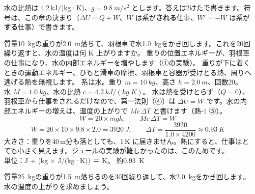 
\noindent 水の比熱は 4.2\,kJ/(kg·K)、$g=\qty{9.8}{m/s^2}$ とします。答えは2けたで書きます。符号は、この章の決まり（$\Delta U=Q+W$、$W$ は系が\textbf{される}仕事、$W'=-W$ は系が\textbf{する}仕事）で書きます。

\label{ph:熱-2:ex1}
\begin{phreidai}
質量\qty{10}{kg}の重りが\qty{2.0}{m}落ちて、羽根車で水\qty{1.0}{kg}をかき回します。これを20回繰り返すと、水の温度は何 K 上がりますか。
\phbamen
重りの位置エネルギーが、羽根車の仕事になり、水の内部エネルギーを増やします（①の実験）。
\phmushi
重りが下に着くときの運動エネルギー、ひもと滑車の摩擦、羽根車と容器が受けとる熱、周りへ逃げる熱を無視します。
\phzu
系は水。重り $m=\qty{10}{kg}$、高さ $h=\qty{2.0}{m}$、回数20。\\
水 $M=\qty{1.0}{kg}$、水の比熱 $c=\qty{4.2}{kJ/(kg.K)}$。
\phriyu
水は熱を受けとらず（$Q=0$）、羽根車から仕事をされるだけなので、第一法則（④）は $\Delta U=W$ です。水の内部エネルギーの増えは、温度の上がりで $Mc\,\Delta T$ と書けます（熱-1 ③）。
\phtateru
\[W=20\times mgh,\qquad Mc\,\Delta T=W\]
\phtoku
\[W=20\times10\times9.8\times2.0=\qty{3920}{J},\qquad \Delta T=\frac{3920}{1.0\times4200}\approx\qty{0.93}{K}\]
\phtashikame
大きさ：重りを40\,m分も落としても、1\,K に届きません。熱にすると、仕事はとても小さく見えます。ジュールの実験が難しかったのは、このためです。\\
単位：J ÷ (kg × J/(kg·K)) ＝ K。
\kotae 約\qty{0.93}{K}
\end{phreidai}
\begin{jibun}
質量\qty{25}{kg}の重りが\qty{1.5}{m}落ちるのを30回繰り返して、水\qty{2.0}{kg}をかき回します。水の温度の上がりを求めましょう。
\end{jibun}

